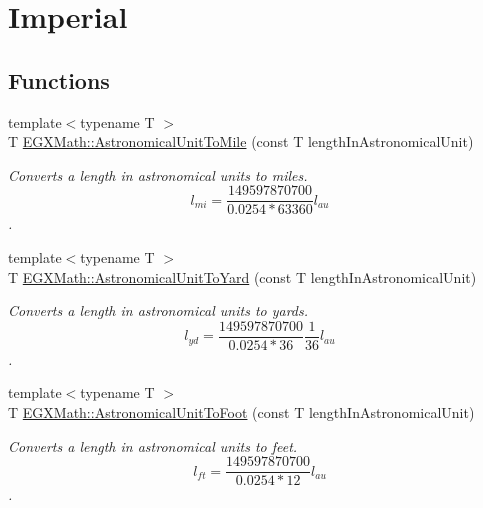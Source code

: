 \hypertarget{group___e_g_x_math-_conversions-_length_conversions-_astronomical-_astronomical_unit-_imperial}{}\section{Imperial}
\label{group___e_g_x_math-_conversions-_length_conversions-_astronomical-_astronomical_unit-_imperial}
\subsection*{Functions}
\begin{DoxyCompactItemize}
\item 
{\footnotesize template$<$typename T $>$ }\\T \mbox{\hyperlink{group___e_g_x_math-_conversions-_length_conversions-_astronomical-_astronomical_unit-_imperial_ga24da571320e08bb0a057e77e15e786b1}{E\+G\+X\+Math\+::\+Astronomical\+Unit\+To\+Mile}} (const T length\+In\+Astronomical\+Unit)
\begin{DoxyCompactList}\small\item\em Converts a length in astronomical units to miles. \[ l_{mi}=\frac{149597870700}{0.0254 * 63360} l_{au} \]. \end{DoxyCompactList}\item 
{\footnotesize template$<$typename T $>$ }\\T \mbox{\hyperlink{group___e_g_x_math-_conversions-_length_conversions-_astronomical-_astronomical_unit-_imperial_ga7d383bdfc1850ed19f5b6df13704c7af}{E\+G\+X\+Math\+::\+Astronomical\+Unit\+To\+Yard}} (const T length\+In\+Astronomical\+Unit)
\begin{DoxyCompactList}\small\item\em Converts a length in astronomical units to yards. \[ l_{yd}= \frac{149597870700}{0.0254 * 36} \frac{1}{36} l_{au} \]. \end{DoxyCompactList}\item 
{\footnotesize template$<$typename T $>$ }\\T \mbox{\hyperlink{group___e_g_x_math-_conversions-_length_conversions-_astronomical-_astronomical_unit-_imperial_ga09db4693d70e24b3a933582badf882af}{E\+G\+X\+Math\+::\+Astronomical\+Unit\+To\+Foot}} (const T length\+In\+Astronomical\+Unit)
\begin{DoxyCompactList}\small\item\em Converts a length in astronomical units to feet. \[ l_{ft}= \frac{149597870700}{0.0254 * 12} l_{au} \]. \end{DoxyCompactList}\item 

\end{DoxyCompactItemize}

